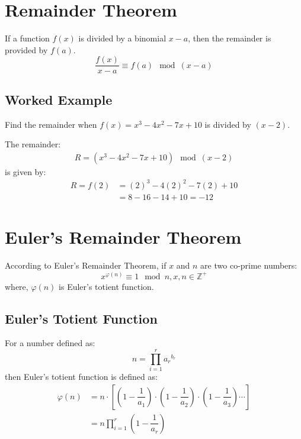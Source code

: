 \documentclass[openany, oneside]{book}
\begin{document}
\section{Remainder Theorem}
If a function $f(x)$ is divided by a binomial $x-a$, then the remainder is provided by $f(a)$.
\begin{equation}
\dfrac{f(x)}{x-a} \equiv f(a) \mod \left(x-a\right)
\end{equation}

\subsection*{Worked Example}
Find the remainder when $f(x) = x^3 - 4 x^2 - 7 x + 10$ is divided by $(x-2)$.\par
The remainder:
\begin{align*}
R = \left(x^3 - 4 x^2 - 7 x + 10\right)\mod\left(x-2\right)
\end{align*}
is given by:
\begin{align*}
R = f(2) & = (2)^3 - 4 (2)^2 - 7(2) + 10\\ & = 8 - 16 - 14 + 10 = -12
\end{align*}

\section{Euler's Remainder Theorem}
According to Euler's Remainder Theorem, if $x$ and $n$ are two co-prime numbers:
\begin{equation}
x^{\varphi (n)} \equiv 1 \mod n, x,n \in \mathbb{Z}^+
\end{equation}
where, $\varphi(n)$ is Euler's totient function.

\subsection{Euler's Totient Function}
For a number defined as:
\begin{equation}
n=\prod_{i=1}^r {a_r}^{b_r}
\end{equation}
then Euler's totient function is defined as:
\begin{align}
\varphi(n) & = n \cdot \left[\left( 1 - \dfrac{1}{a_1} \right) \cdot \left( 1 - \dfrac{1}{a_2} \right) \cdot \left( 1 - \dfrac{1}{a_3} \right) \cdots \right] \nonumber \\
& = n \prod_{i=1}^r \left(1 - \dfrac{1}{a_r} \right)
\end{align}
\end{document}
